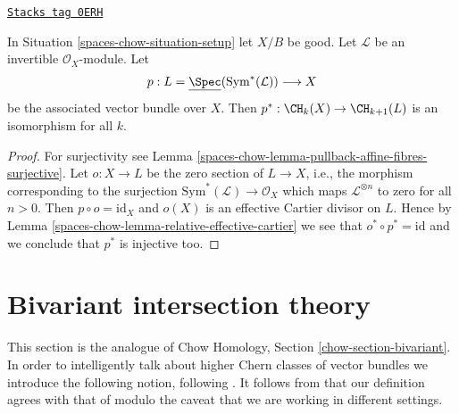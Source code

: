\begin{lemma}[Linebundle]
\label{spaces-chow-lemma-linebundle}
\href{https://stacks.math.columbia.edu/tag/0ERH}{\texttt{Stacks tag 0ERH}}

In Situation \ref{spaces-chow-situation-setup} let $X/B$ be good.
Let $\mathcal{L}$ be an invertible $\mathcal{O}_X$-module.
Let
$$
p :
L = \underline{\Spec}(\text{Sym}^*(\mathcal{L}))
\longrightarrow
X
$$
be the associated vector bundle over $X$.
Then $p^* : \CH_k(X) \to \CH_{k + 1}(L)$ is an isomorphism for all $k$.
\end{lemma}

\begin{proof}
For surjectivity see Lemma \ref{spaces-chow-lemma-pullback-affine-fibres-surjective}.
Let $o : X \to L$ be the zero section of $L \to X$, i.e., the morphism
corresponding to the surjection $\text{Sym}^*(\mathcal{L}) \to \mathcal{O}_X$
which maps $\mathcal{L}^{\otimes n}$ to zero for all $n > 0$.
Then $p \circ o = \text{id}_X$ and $o(X)$ is an effective
Cartier divisor on $L$. Hence by Lemma \ref{spaces-chow-lemma-relative-effective-cartier}
we see that $o^* \circ p^* = \text{id}$ and we conclude that $p^*$ is
injective too.
\end{proof}

\section{Bivariant intersection theory}
\label{spaces-chow-section-bivariant}
This section is the analogue of
Chow Homology, Section \ref{chow-section-bivariant}.
In order to intelligently talk about higher Chern classes of vector
bundles we introduce the following notion, following \cite{FM}.
It follows from \cite[Theorem 17.1]{F} that our definition agrees
with that of \cite{F} modulo the caveat that we are working in different
settings.

